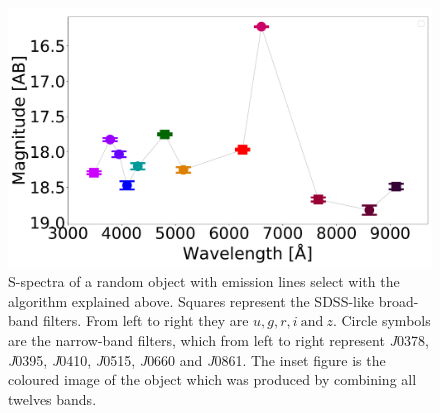 \documentclass[fleqn,usenatbib]{mnras}
\begin{document}
\begin{figure}
\includegraphics[width=0.9\linewidth]{Figs/photopectrum_splus_HYDRA-0026-052331_Good-LD-Halpha-DR3_noFlag_merge-takeoutbad-Final_PStotal.pdf}
\centering
{}
\caption{S-spectra of a random object with emission lines select with the algorithm explained
  above. Squares represent the SDSS-like broad-band filters. From left to right 
  they are \(u, g, r, i~\text{and}~ z\). Circle symbols are the narrow-band filters,
  which from left to right represent \textit{J}0378, \textit{J}0395, \textit{J}0410,
  \textit{J}0515, \textit{J}0660 and \textit{J}0861. The inset figure is the coloured image 
  of the object which was produced by combining all twelves bands.}
\label{fig:Spectra}
\end{figure}
\end{document}
